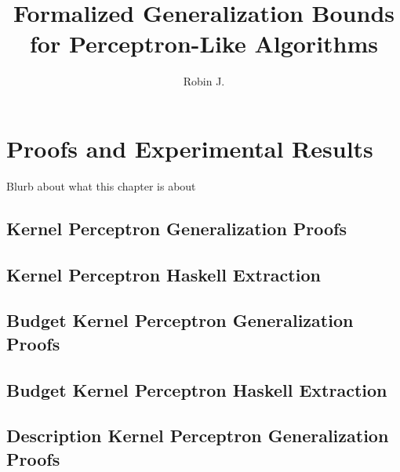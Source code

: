 \documentclass[numbered,pdftex]{ohio-etd}
\title     {Formalized Generalization Bounds for Perceptron-Like Algorithms}
\author    {Robin J.}{Kelby}
\begin{document}
 

\makefrontmatter    %




 
\chapter{Proofs and Experimental Results}\label{ResultsChapter}
Blurb about what this chapter is about 
\section{Kernel Perceptron Generalization Proofs}\label{KPProofs}
\section{Kernel Perceptron Haskell Extraction}\label{KPHaskell}
\section{Budget Kernel Perceptron Generalization Proofs}\label{KPBProofs}
\section{Budget Kernel Perceptron Haskell Extraction}\label{KPBHaskell}
\section{Description Kernel Perceptron Generalization Proofs}\label{KPDProofs}
\end{document}
